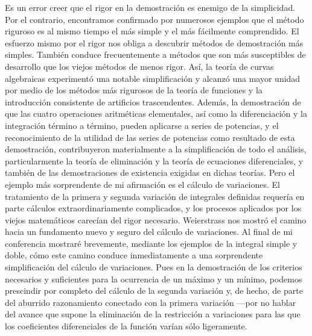 \documentclass[a4paper, 12pt]{article}
\begin{document}
Es un error creer que el rigor en la demostración es enemigo de la simplicidad. Por el contrario, encontramos confirmado por numerosos ejemplos que el método riguroso es al mismo tiempo el más simple y el más fácilmente comprendido. El esfuerzo mismo por el rigor nos obliga a descubrir métodos de demostración más simples. También conduce frecuentemente a métodos que son más susceptibles de desarrollo que los viejos métodos de menos rigor. Así, la teoría de curvas algebraicas experimentó una notable simplificación y alcanzó una mayor unidad por medio de los métodos más rigurosos de la teoría de funciones y la introducción consistente de artificios trascendentes. Además, la demostración de que las cuatro operaciones aritméticas elementales, así como la diferenciación y la integración término a término, pueden aplicarse a series de potencias, y el reconocimiento de la utilidad de las series de potencias como resultado de esta demostración, contribuyeron materialmente a la simplificación de todo el análisis, particularmente la teoría de eliminación y la teoría de ecuaciones diferenciales, y también de las demostraciones de existencia exigidas en dichas teorías. Pero el ejemplo más sorprendente de mi afirmación es el cálculo de variaciones. El tratamiento de la primera y segunda variación de integrales definidas requería en parte cálculos extraordinariamente complicados, y los procesos aplicados por los viejos matemáticos carecían del rigor necesario. Weierstrass nos mostró el camino hacia un fundamento nuevo y seguro del cálculo de variaciones. Al final de mi conferencia mostraré brevemente, mediante los ejemplos de la integral simple y doble, cómo este camino conduce inmediatamente a una sorprendente simplificación del cálculo de variaciones. Pues en la demostración de los criterios necesarios y suficientes para la ocurrencia de un máximo y un mínimo, podemos prescindir por completo del cálculo de la segunda variación y, de hecho, de parte del aburrido razonamiento conectado con la primera variación ---por no hablar del avance que supone la eliminación de la restricción a variaciones para las que los coeficientes diferenciales de la función varían sólo ligeramente. 
\end{document}
